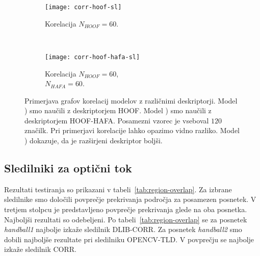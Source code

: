 \begin{figure}[!htbp]
	\centering
	\begin{subfigure}[t]{0.45\columnwidth}
		\texttt{[image: corr-hoof-sl]}
		\caption{Korelacija $N_{HOOF}=60$.}
		\label{fig:izbira-hoof}
	\end{subfigure}
	~
	\begin{subfigure}[t]{0.45\columnwidth}
		\texttt{[image: corr-hoof-hafa-sl]}
		\caption{Korelacija $N_{HOOF}=60$,\\$N_{HAFA}=60$.}
		\label{fig:izbira-hoofhafa}
	\end{subfigure}
	\caption[Primerjava modelov z deskriptorji HOOF in HOOF-HAFA]{Primerjava grafov korelacij modelov z različnimi deskriptorji. Model ) smo naučili z deskriptorjem HOOF. Model ) smo naučili z deskriptorjem HOOF-HAFA. Posamezni vzorec je vseboval $120$ značilk. Pri primerjavi korelacije lahko opazimo vidno razliko. Model ) dokazuje, da je razširjeni deskriptor boljši.}
	\label{fig:izbira}
\end{figure}




















\subsection{Sledilniki za optični tok} \label{sec:rezultati-sledilnikov-za-opticni-tok}


Rezultati testiranja so prikazani v tabeli~\ref{tab:region-overlap}. Za izbrane sledilnike smo določili povprečje prekrivanja področja za posamezen posnetek. V tretjem stolpcu je predstavljeno povprečje prekrivanja glede na oba posnetka. Najboljši rezultati so odebeljeni. Po tabeli~\ref{tab:region-overlap} se za posnetek \textit{handball1} najbolje izkaže sledilnik DLIB-CORR. Za posnetek \textit{handball2} smo dobili najboljše rezultate pri sledilniku OPENCV-TLD. V povprečju se najbolje izkaže sledilnik CORR.




